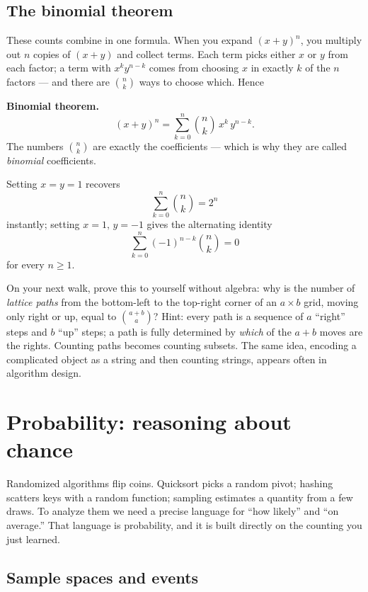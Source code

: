 \subsection{The binomial theorem}

These counts combine in one formula. When you expand $(x + y)^n$, you
multiply out $n$ copies of $(x+y)$ and collect terms. Each term picks either $x$ or
$y$ from each factor; a term with $x^k y^{n-k}$ comes from choosing $x$ in exactly $k$
of the $n$ factors --- and there are $\binom{n}{k}$ ways to choose which. Hence

\begin{formalbox}
\textbf{Binomial theorem.}
\[
(x + y)^n = \sum_{k=0}^{n} \binom{n}{k}\, x^k\, y^{n-k}.
\]
The numbers $\binom{n}{k}$ are exactly the coefficients --- which is why they are
called \emph{binomial} coefficients.
\end{formalbox}

Setting $x = y = 1$ recovers
\[
\sum_{k=0}^{n} \binom{n}{k} = 2^n
\]
instantly; setting $x = 1,\, y = -1$ gives the alternating identity
\[
\sum_{k=0}^{n} (-1)^{n-k}\binom{n}{k} = 0
\]
for every $n \ge 1$.

\begin{walkbox}
On your next walk, prove this to yourself without algebra: why is the number of
\emph{lattice paths} from the bottom-left to the top-right corner of an $a \times b$
grid, moving only right or up, equal to $\binom{a+b}{a}$? Hint: every path is a
sequence of $a$ ``right'' steps and $b$ ``up'' steps; a path is fully determined by
\emph{which} of the $a+b$ moves are the rights. Counting paths becomes counting
subsets. The same idea, encoding a complicated object as a string and then
counting strings, appears often in algorithm design.
\end{walkbox}

\section{Probability: reasoning about chance}
\label{ch38:probability}

Randomized algorithms flip coins. Quicksort picks a random pivot; hashing scatters
keys with a random function; sampling estimates a quantity from a few draws. To
analyze them we need a precise language for ``how likely'' and ``on average.'' That
language is probability, and it is built directly on the counting you just learned.

\subsection{Sample spaces and events}

